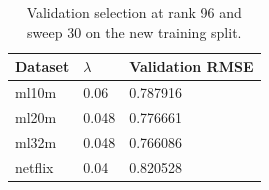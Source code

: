 \begin{table}
\centering
\caption{Validation selection at rank 96 and sweep 30 on the new training split.}
\begin{tabular}{lll}
\hline
Dataset & $\lambda$ & Validation RMSE \\
\hline
ml10m & 0.06 & 0.787916 \\
ml20m & 0.048 & 0.776661 \\
ml32m & 0.048 & 0.766086 \\
netflix & 0.04 & 0.820528 \\
\hline
\end{tabular}
\end{table}
